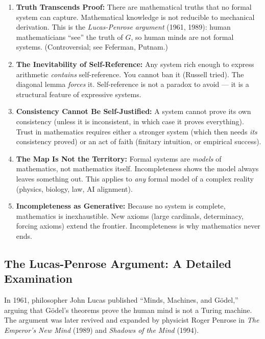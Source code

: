 \begin{enumerate}
\item \textbf{Truth Transcends Proof:} There are mathematical truths that no formal system can capture. Mathematical knowledge is not reducible to mechanical derivation. This is the \emph{Lucas-Penrose argument} (1961, 1989): human mathematicians ``see'' the truth of $G$, so human minds are not formal systems. (Controversial; see Feferman, Putnam.)

\item \textbf{The Inevitability of Self-Reference:} Any system rich enough to express arithmetic \emph{contains} self-reference. You cannot ban it (Russell tried). The diagonal lemma \emph{forces} it. Self-reference is not a paradox to avoid --- it is a structural feature of expressive systems.

\item \textbf{Consistency Cannot Be Self-Justified:} A system cannot prove its own consistency (unless it is inconsistent, in which case it proves everything). Trust in mathematics requires either a stronger system (which then needs \emph{its} consistency proved) or an act of faith (finitary intuition, or empirical success).

\item \textbf{The Map Is Not the Territory:} Formal systems are \emph{models} of mathematics, not mathematics itself. Incompleteness shows the model always leaves something out. This applies to \emph{any} formal model of a complex reality (physics, biology, law, AI alignment).

\item \textbf{Incompleteness as Generative:} Because no system is complete, mathematics is inexhaustible. New axioms (large cardinals, determinacy, forcing axioms) extend the frontier. Incompleteness is why mathematics never ends.
\end{enumerate}

\subsection*{The Lucas-Penrose Argument: A Detailed Examination}

In 1961, philosopher John Lucas published ``Minds, Machines, and Gödel,'' arguing that Gödel's theorems prove the human mind is not a Turing machine. The argument was later revived and expanded by physicist Roger Penrose in \emph{The Emperor's New Mind} (1989) and \emph{Shadows of the Mind} (1994).

